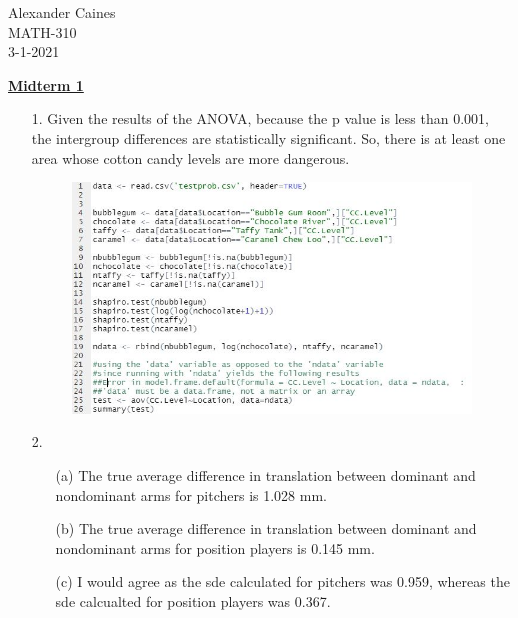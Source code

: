 \documentclass[12pt]{article}
\begin{document}
\vspace{1.0 \baselineskip}

\begin{flushright}
	Alexander Caines\\
	MATH-310\\
	3-1-2021\\
\end{flushright}

\begin{center}
	\textbf{\underline{Midterm 1}}
\end{center}



\begin{enumerate}
	\item[1.] Given the results of the ANOVA, because the p value is less than 0.001,
		the intergroup differences are statistically significant.
		So, there is at least one area whose cotton candy levels are more dangerous.
		\begin{figure}[!h]
			\centering
			\includegraphics[width=11cm]{p1.JPG}
		\end{figure}
	\item[2.] 
		\begin{enumerate}
			\item[(a)] The true average difference in translation between dominant 
				and nondominant arms for pitchers is 1.028 mm. 
			\item[(b)] The true average difference in translation between dominant 
				and nondominant arms for position players is 0.145 mm. 
			\item[(c)] I would agree as the sde calculated for pitchers was 0.959, 
				whereas the sde calcualted for position players was 0.367.
		\end{enumerate}
		\begin{figure}[!h]
			\centering

\end{figure}
\end{enumerate}
\end{document}
